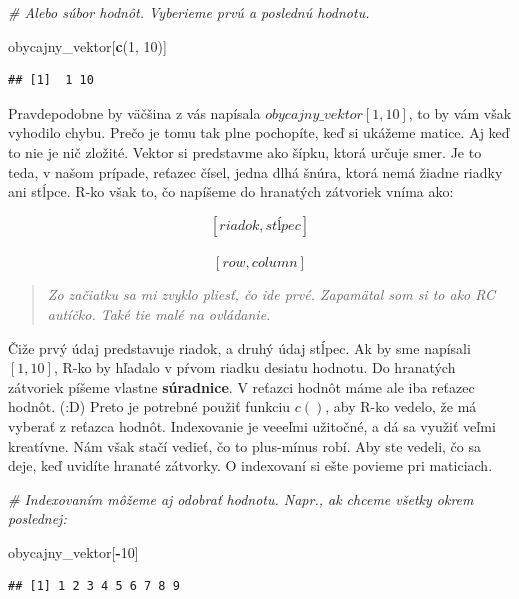 \documentclass[]{article}
\newenvironment{Shaded}{\begin{snugshade}}{\end{snugshade}}
\newcommand{\CommentTok}[1]{\textcolor[rgb]{0.56,0.35,0.01}{\textit{#1}}}
\newcommand{\DecValTok}[1]{\textcolor[rgb]{0.00,0.00,0.81}{#1}}
\newcommand{\KeywordTok}[1]{\textcolor[rgb]{0.13,0.29,0.53}{\textbf{#1}}}
\newcommand{\NormalTok}[1]{#1}
\newcommand{\OperatorTok}[1]{\textcolor[rgb]{0.81,0.36,0.00}{\textbf{#1}}}
\begin{document}
\begin{Shaded}
\begin{Highlighting}[]
\CommentTok{# Alebo súbor hodnôt. Vyberieme prvú a poslednú hodnotu.}

\NormalTok{obycajny_vektor[}\KeywordTok{c}\NormalTok{(}\DecValTok{1}\NormalTok{, }\DecValTok{10}\NormalTok{)]}
\end{Highlighting}
\end{Shaded}

\begin{verbatim}
## [1]  1 10
\end{verbatim}

Pravdepodobne by väčšina z vás napísala \(obycajny\_vektor[1, 10]\), to
by vám však vyhodilo chybu. Prečo je tomu tak plne pochopíte, keď si
ukážeme matice. Aj keď to nie je nič zložité. Vektor si predstavme ako
šípku, ktorá určuje smer. Je to teda, v našom prípade, reťazec čísel,
jedna dlhá šnúra, ktorá nemá žiadne riadky ani stĺpce. R-ko však to, čo
napíšeme do hranatých zátvoriek vníma ako:

\[[riadok, stĺpec]\]\\
\[[row, column]\]

\begin{quote}
\emph{Zo začiatku sa mi zvyklo pliesť, čo ide prvé. Zapamätal som si to
ako RC autíčko. Také tie malé na ovládanie.}
\end{quote}

Čiže prvý údaj predstavuje riadok, a druhý údaj stĺpec. Ak by sme
napísali \([1, 10]\), R-ko by hľadalo v pŕvom riadku desiatu hodnotu. Do
hranatých zátvoriek píšeme vlastne \textbf{súradnice}. V reťazci hodnôt
máme ale iba reťazec hodnôt. (:D) Preto je potrebné použiť funkciu
\(c()\), aby R-ko vedelo, že má vyberať z reťazca hodnôt. Indexovanie je
veeeľmi užitočné, a dá sa využiť veľmi kreatívne. Nám však stačí vedieť,
čo to plus-mínus robí. Aby ste vedeli, čo sa deje, keď uvidíte hranaté
zátvorky. O indexovaní si ešte povieme pri maticiach.

\begin{Shaded}
\begin{Highlighting}[]
\CommentTok{# Indexovaním môžeme aj odobrať hodnotu. Napr., ak chceme všetky okrem poslednej:}

\NormalTok{obycajny_vektor[}\OperatorTok{-}\DecValTok{10}\NormalTok{]}
\end{Highlighting}
\end{Shaded}

\begin{verbatim}
## [1] 1 2 3 4 5 6 7 8 9
\end{verbatim}
\end{document}
